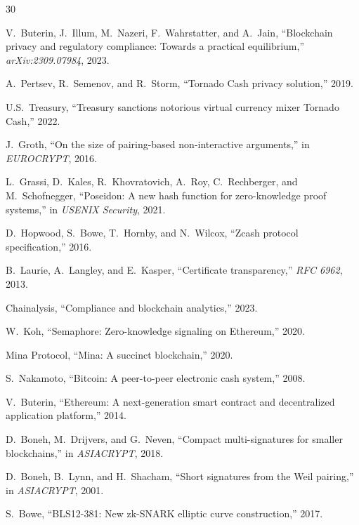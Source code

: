 \documentclass[11pt,a4paper]{article}
\begin{document}

\begin{thebibliography}{30}

V.~Buterin, J.~Illum, M.~Nazeri, F.~Wahrstatter, and A.~Jain, ``Blockchain privacy and regulatory compliance: Towards a practical equilibrium,'' \emph{arXiv:2309.07984}, 2023.

A.~Pertsev, R.~Semenov, and R.~Storm, ``Tornado Cash privacy solution,'' 2019.

U.S.~Treasury, ``Treasury sanctions notorious virtual currency mixer Tornado Cash,'' 2022.

J.~Groth, ``On the size of pairing-based non-interactive arguments,'' in \emph{EUROCRYPT}, 2016.

L.~Grassi, D.~Kales, R.~Khovratovich, A.~Roy, C.~Rechberger, and M.~Schofnegger, ``Poseidon: A new hash function for zero-knowledge proof systems,'' in \emph{USENIX Security}, 2021.

D.~Hopwood, S.~Bowe, T.~Hornby, and N.~Wilcox, ``Zcash protocol specification,'' 2016.

B.~Laurie, A.~Langley, and E.~Kasper, ``Certificate transparency,'' \emph{RFC 6962}, 2013.

Chainalysis, ``Compliance and blockchain analytics,'' 2023.

W.~Koh, ``Semaphore: Zero-knowledge signaling on Ethereum,'' 2020.

Mina Protocol, ``Mina: A succinct blockchain,'' 2020.

S.~Nakamoto, ``Bitcoin: A peer-to-peer electronic cash system,'' 2008.

V.~Buterin, ``Ethereum: A next-generation smart contract and decentralized application platform,'' 2014.

D.~Boneh, M.~Drijvers, and G.~Neven, ``Compact multi-signatures for smaller blockchains,'' in \emph{ASIACRYPT}, 2018.

D.~Boneh, B.~Lynn, and H.~Shacham, ``Short signatures from the Weil pairing,'' in \emph{ASIACRYPT}, 2001.

S.~Bowe, ``BLS12-381: New zk-SNARK elliptic curve construction,'' 2017.


\end{thebibliography}
\end{document}
